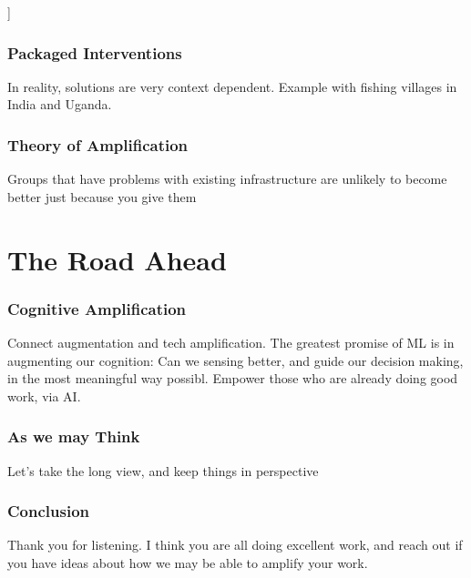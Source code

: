 \documentclass[10pt,mathserif]{beamer}
\begin{document}
\begin{frame}]
  \frametitle{Packaged Interventions}
  In reality, solutions are very context dependent.
  Example with fishing villages in India and Uganda.
\end{frame}

\begin{frame}
  \frametitle{Theory of Amplification}
  Groups that have problems with existing infrastructure are unlikely to become
  better just because you give them
\end{frame}

\section{The Road Ahead}
\label{sec:label}

\begin{frame}
  \frametitle{Cognitive Amplification}
  Connect augmentation and tech amplification.
  The greatest promise of ML is in augmenting our cognition: Can we sensing
  better, and guide our decision making, in the most meaningful way possibl.
  Empower those who are already doing good work, via AI.
\end{frame}

\begin{frame}
  \frametitle{As we may Think}
  Let's take the long view, and keep things in perspective
\end{frame}

\begin{frame}
  \frametitle{Conclusion}
  Thank you for listening. I think you are all doing excellent work, and reach
  out if you have ideas about how we may be able to amplify your work.
\end{frame}



\end{document}
